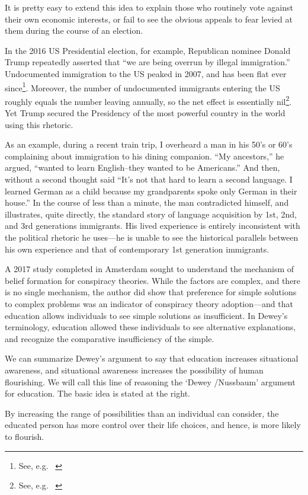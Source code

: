 It is pretty easy to extend this idea to explain those who routinely vote against their own economic interests, or fail to see the obvious appeals to fear levied at them during the course of an election. 

In the 2016 US Presidential election, for example, Republican nominee Donald Trump repeatedly asserted that ``we are being overrun by illegal immigration.'' Undocumented immigration to the US peaked in 2007, and has been flat ever since\footnote{See, e.g. ~\citep{Anonymous:2016uj}}. Moreover, the number of undocumented immigrants entering the US roughly equals the number leaving annually, so the net effect is essentially nil\footnote{See, e.g. ~\citep{Gonzales:Zl5mJiyA}}. Yet Trump secured the Presidency of the most powerful country in the world using this rhetoric.

As an example, during a recent train trip, I overheard a man in his 50's or 60's complaining about immigration to his dining companion. ``My ancestors,'' he argued, ``wanted to learn English--they wanted to be Americans.'' And then, without a second thought said ``It's not that hard to learn a second language. I learned German as a child because my grandparents spoke only German in their house.'' In the course of less than a minute, the man contradicted himself, and illustrates, quite directly, the standard story of language acquisition by 1st, 2nd, and 3rd generations immigrants. His lived experience is entirely inconsistent with the political rhetoric he uses---he is unable to see the historical parallels between his own experience and that of contemporary 1st generation immigrants.

A 2017 study completed in Amsterdam sought to understand the mechanism of belief formation for conspiracy theories. While the factors are complex, and there is no single mechanism, the author did show that preference for simple solutions to complex problems was an indicator of conspiracy theory adoption---and that education allows individuals to see simple solutions as insufficient. In Dewey's terminology, education allowed these individuals to see alternative explanations, and recognize the comparative insufficiency of the simple. ~\citep{vanProoijen:2016df}

We can summarize Dewey's argument to say that education increases situational awareness, and situational awareness increases the possibility of human flourishing. We will call this line of reasoning the `Dewey \slash  Nussbaum' argument for education. The basic idea is stated at the right. 
\begin{thesis}\label{thesis:deweynussbaum}
By increasing the range of possibilities than an individual can consider, the educated person has more control over their life choices, and hence, is more likely to flourish.  
\end{thesis}

